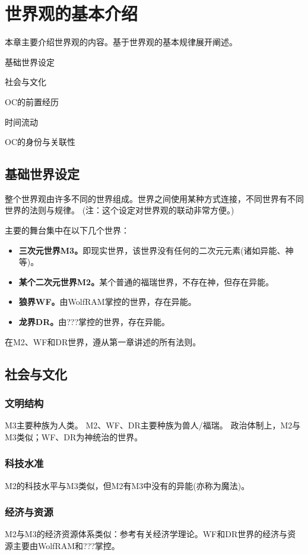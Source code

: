 \documentclass[lang=cn,newtx,10pt,scheme=chinese]{elegantbook}
\newcommand{\wf}{WolfRAM}
\newcommand{\dr}{???}
\begin{document}
\chapter{世界观的基本介绍}
本章主要介绍世界观的内容。基于世界观的基本规律展开阐述。
\begin{introduction}
    \item 基础世界设定
    \item 社会与文化
    \item OC的前置经历
    \item 时间流动
    \item OC的身份与关联性
\end{introduction}

\section{基础世界设定}
整个世界观由许多不同的世界组成。世界之间使用某种方式连接，不同世界有不同世界的法则与规律。
(注：这个设定对世界观的联动非常方便。)

主要的舞台集中在以下几个世界：
\begin{itemize}
    \item \textbf{三次元世界M3。}即现实世界，该世界没有任何的二次元元素(诸如异能、神等)。
    \item \textbf{某个二次元世界M2。}某个普通的福瑞世界，不存在神，但存在异能。
    \item \textbf{狼界WF。}由\wf{}掌控的世界，存在异能。
    \item \textbf{龙界DR。}由\dr{}掌控的世界，存在异能。
\end{itemize}

在M2、WF和DR世界，遵从第一章讲述的所有法则。

\section{社会与文化}
\subsection{文明结构}
M3主要种族为人类。
M2、WF、DR主要种族为兽人/福瑞。
政治体制上，M2与M3类似；WF、DR为神统治的世界。

\subsection{科技水准}
M2的科技水平与M3类似，但M2有M3中没有的异能(亦称为魔法)。

\subsection{经济与资源}
M2与M3的经济资源体系类似：参考有关经济学理论。WF和DR世界的经济与资源主要由\wf{}和\dr{}掌控。
\end{document}
